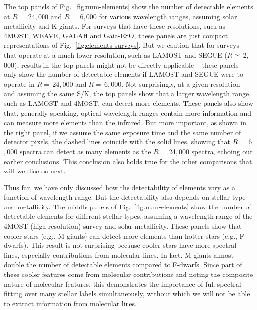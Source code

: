 \documentclass[iop]{emulateapj}
\begin{document}
\begin{CJK*}{UTF8}{gbsn}
The top panels of Fig.~\ref{fig:num-elements} show the number of detectable elements at $R = \,$24$,$000 and $R = \,$6$,$000 for various wavelength ranges, assuming solar metallicity and K-giants. For surveys that have these resolutions, such as 4MOST, WEAVE, GALAH and Gaia-ESO, these panels are just compact representations of Fig.~\ref{fig:elements-surveys}. But we caution that for surveys that operate at a much lower resolution, such as LAMOST and SEGUE ($R \simeq \,$2$,$000), results in the top panels might not be directly applicable -- these panels only show the number of detectable elements if LAMOST and SEGUE were to operate in $R = \,$24$,$000 and $R = \,$6$,$000. Not surprisingly, at a given resolution and assuming the same S/N, the top panels show that a larger wavelength range, such as LAMOST and 4MOST, can detect more elements. These panels also show that, generally speaking, optical wavelength ranges contain more information and can measure more elements than the infrared. But more important, as shown in the right panel, if we assume the same exposure time and the same number of detector pixels, the dashed lines coincide with the solid lines, showing that $R =\,$6$,$000 spectra can detect as many elements as the $R = \,$24$,$000 spectra, echoing our earlier conclusions. This conclusion also holds true for the other comparisons that will we discuss next.

Thus far, we have only discussed how the detectability of elements vary as a function of wavelength range. But the detectability also depends on stellar type and metallicity. The middle panels of Fig.~\ref{fig:num-elements} show the number of detectable elements for different stellar types, assuming a wavelength range of the 4MOST (high-resolution) survey and solar metallicity. These panels show that cooler stars (e.g., M-giants) can detect more elements than hotter stars (e.g., F-dwarfs). This result is not surprising because cooler stars have more spectral lines, especially contributions from molecular lines. In fact. M-giants almost double the number of detectable elements compared to F-dwarfs. Since part of these cooler features come from molecular contributions and noting the composite nature of molecular features, this demonstrates the importance of full spectral fitting over many stellar labels simultaneously, without which we will not be able to extract information from molecular lines. 


\end{CJK*}
\end{document}
